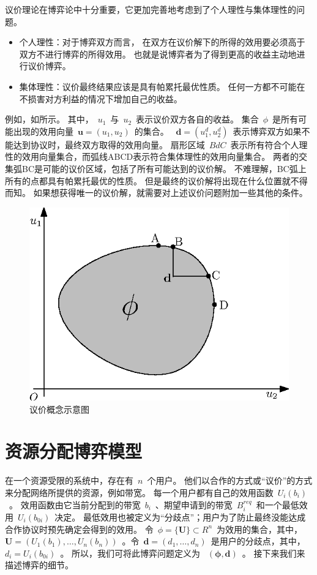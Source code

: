 议价理论在博弈论中十分重要，它更加完善地考虑到了个人理性与集体理性的问题。
\begin{itemize}
\item 个人理性：对于博弈双方而言，
在双方在议价解下的所得的效用要必须高于双方不进行博弈的所得效用。
也就是说博弈者为了得到更高的收益主动地进行议价博弈。
\item 集体理性：议价最终结果应该是具有帕累托最优性质。
任何一方都不可能在不损害对方利益的情况下增加自己的收益。
\end{itemize}
例如，如所示。
其中，~$u_1$~与~$u_2$~表示议价双方各自的收益。
集合~$\phi$~是所有可能出现的效用向量~$\mathbf{u}=(u_1,u_2)$~的集合。
~$\mathbf{d}=(u_1^d, u_2^d)$~表示博弈双方如果不能达到协议时，最终双方取得的效用向量。
扇形区域~$BdC$~表示所有符合个人理性的效用向量集合，而弧线ABCD表示符合集体理性的效用向量集合。
两者的交集弧BC是可能的议价区域，包括了所有可能达到的议价解。
不难理解，BC弧上所有的点都具有帕累托最优的性质。
但是最终的议价解将出现在什么位置就不得而知。
如果想获得唯一的议价解，就需要对上述议价问题附加一些其他的条件。
\begin{figure}[!tb] 
    \centering
   \begin{minipage}[t]{0.5\linewidth} 
    \centering 
    \includegraphics[width = \textwidth]{bargain_basic_concept} 
    \caption{议价概念示意图} 
    \label{fig:chap_bargain:bargain_basic_concept} 
  \end{minipage}%
\end{figure}


\section{资源分配博弈模型}
在一个资源受限的系统中，存在有~$n$~个用户。
他们以合作的方式或“议价”的方式来分配网络所提供的资源，例如带宽。
每一个用户都有自己的效用函数~$U_i(b_i)$~。
效用函数由它当前分配到的带宽~$b_i$~、期望申请到的带宽~$B_i^{req}$~和一个最低效用~$U_i(b_{0i})$~决定。
最低效用也被定义为“分歧点”；用户为了防止最终没能达成合作协议时预先确定会得到的效用。
令~$\phi = \{ \mathbf{U} \} \subset R^n$~为效用的集合，其中，~$\mathbf{U} =(U_1(b_1), \ldots, U_n(b_n))$~。令~$\mathbf{d} = (d_1, \ldots, d_n)$~是用户的分歧点，其中，~$d_i = U_i(b_{0i})$~。
所以，我们可将此博弈问题定义为 ~$(\mathbf{\phi,d})$~。
接下来我们来描述博弈的细节。

